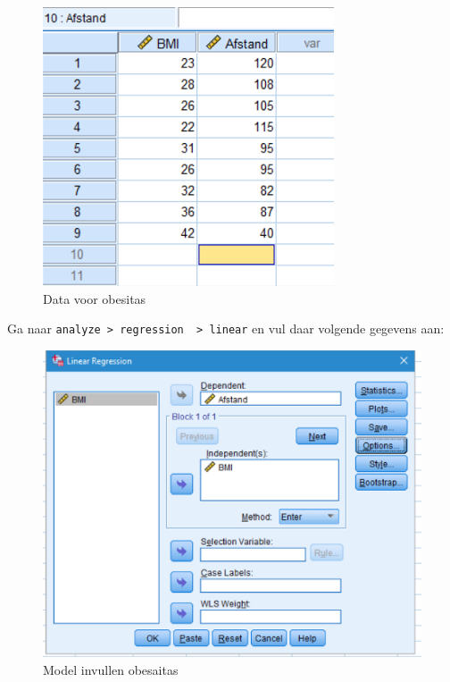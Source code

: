 \documentclass[
]{book}
\theoremstyle{definition}
\theoremstyle{definition}
\theoremstyle{definition}
\theoremstyle{definition}
\theoremstyle{remark}
\begin{document}
\begin{figure}
\includegraphics[width=1\linewidth]{img/ex_spss_lm_3} \caption{Data voor obesitas}\label{fig:exspsslm3}
\end{figure}

Ga naar \texttt{analyze\ \textgreater{}\ regression\ \ \textgreater{}\ linear} en vul daar volgende gegevens aan:

\begin{figure}
\includegraphics[width=1\linewidth]{img/ex_spss_lm_4} \caption{Model invullen obesaitas}\label{fig:exspsslm4}
\end{figure}
\end{document}
